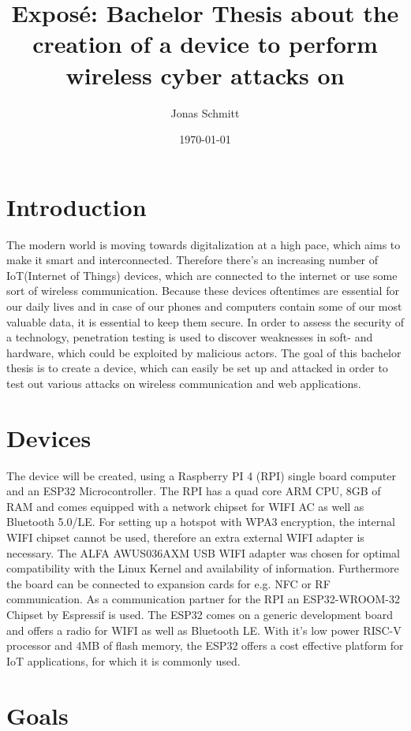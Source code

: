 \documentclass{article}
\title{Exposé: Bachelor Thesis about the creation of a device to perform wireless cyber attacks on}
\author{Jonas Schmitt}
\date{\today}
\begin{document}
\maketitle

\section{Introduction}

The modern world is moving towards digitalization at a high pace, which aims to make it smart and interconnected. Therefore there's an increasing number of IoT(Internet of Things) devices, 
which are connected to the internet or use some sort of wireless communication.
Because these devices oftentimes are essential for our daily lives and in case of our phones and computers contain some of our most valuable data, it is essential to keep them secure.
In order to assess the security of a technology, penetration testing is used to discover weaknesses in soft- and hardware, which could be exploited by malicious actors.
The goal of this bachelor thesis is to create a device, which can easily be set up and attacked in order to test out various attacks on wireless communication and web applications.  

\section{Devices}

The device will be created, using a Raspberry PI 4 (RPI) single board computer and an ESP32 Microcontroller. 
The RPI has a quad core ARM CPU, 8GB of RAM and comes equipped with a network chipset for WIFI AC as well as Bluetooth 5.0/LE. 
For setting up a hotspot with WPA3 encryption, the internal WIFI chipset cannot be used, therefore an extra external WIFI adapter is necessary.
The ALFA AWUS036AXM USB WIFI adapter was chosen for optimal compatibility with the Linux Kernel and availability of information.
Furthermore the board can be connected to expansion cards for e.g. NFC or RF communication.
As a communication partner for the RPI an ESP32-WROOM-32 Chipset by Espressif is used. The ESP32 comes on a generic development board and offers a radio for WIFI as well as Bluetooth LE.
With it's low power RISC-V processor and 4MB of flash memory, the ESP32 offers a cost effective platform for IoT applications, for which it is commonly used. 



\section{Goals}
\end{document}
